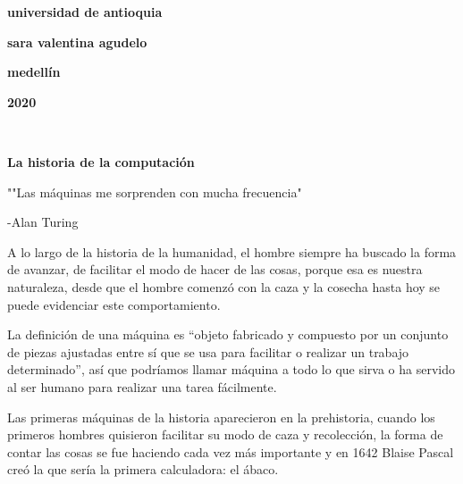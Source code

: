 \documentclass[12pt]{article}
\begin{document}
\begin{center}
\bf{\sc\Huge universidad de antioquia}\\
\end{center}
\vspace{120pt}
\begin{center}
\bf{\sc\Huge sara valentina agudelo  }\\
\end{center}
\vspace{200pt}
\begin{center}
\bf{\sc\Huge medellín}
\end{center}
\begin{center}
\bf{\sc\Huge 2020}\\
\end{center}\
\newpage



\begin{center}

\bf{\sc\Huge La historia de la computación }\\
\end{center}
\begin{flushleft}
\vspace{25PT}
\large
""Las máquinas me sorprenden con mucha frecuencia" 


-Alan Turing
\end{flushleft}
\vspace{}

\large

A lo largo de la historia de la humanidad, el hombre siempre ha buscado la forma de avanzar, de facilitar el modo de hacer de las cosas, porque esa es nuestra naturaleza, desde que el hombre comenzó con la caza y la cosecha hasta hoy se puede evidenciar este comportamiento. 


\vspace{}
\vspace{30pt}
La definición de una máquina es “objeto fabricado y compuesto por un conjunto de piezas ajustadas entre sí que se usa para facilitar o realizar un trabajo determinado”, así que podríamos llamar máquina a todo lo que sirva o ha servido al ser humano para realizar una tarea fácilmente. 

\vspace{30pt}
Las primeras máquinas de la historia aparecieron en la prehistoria, cuando los primeros hombres quisieron facilitar su modo de caza y recolección, la forma de contar las cosas se fue haciendo cada vez más importante y en 1642 Blaise Pascal creó la que sería la primera calculadora: el ábaco.
\end{document}
